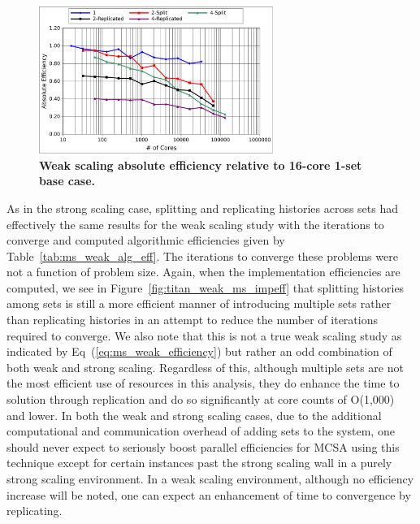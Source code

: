\documentclass{snamc2013}
\begin{document}
\begin{figure}[h!]
  \begin{center}
    \includegraphics[width=3in]{titan_weak_ms_eff.pdf}
  \end{center}
  \caption{\textbf{Weak scaling absolute efficiency relative to
      16-core 1-set base case.}}
  \label{fig:titan_weak_ms_eff}
\end{figure}

As in the strong scaling case, splitting and replicating histories
across sets had effectively the same results for the weak scaling
study with the iterations to converge and computed algorithmic
efficiencies given by Table~\ref{tab:ms_weak_alg_eff}. The iterations
to converge these problems were not a function of problem size. Again,
when the implementation efficiencies are computed, we see in
Figure~\ref{fig:titan_weak_ms_impeff} that splitting histories among
sets is still a more efficient manner of introducing multiple sets
rather than replicating histories in an attempt to reduce the number
of iterations required to converge.  We also note that this is not a
true weak scaling study as indicated by
Eq~(\ref{eq:ms_weak_efficiency}) but rather an odd combination of both
weak and strong scaling. Regardless of this, although multiple sets
are not the most efficient use of resources in this analysis, they do
enhance the time to solution through replication and do so
significantly at core counts of O(1,000) and lower. In both the weak
and strong scaling cases, due to the additional computational and
communication overhead of adding sets to the system, one should never
expect to seriously boost parallel efficiencies for MCSA using this
technique except for certain instances past the strong scaling wall in
a purely strong scaling environment. In a weak scaling environment,
although no efficiency increase will be noted, one can expect an
enhancement of time to convergence by replicating.
\end{document}

